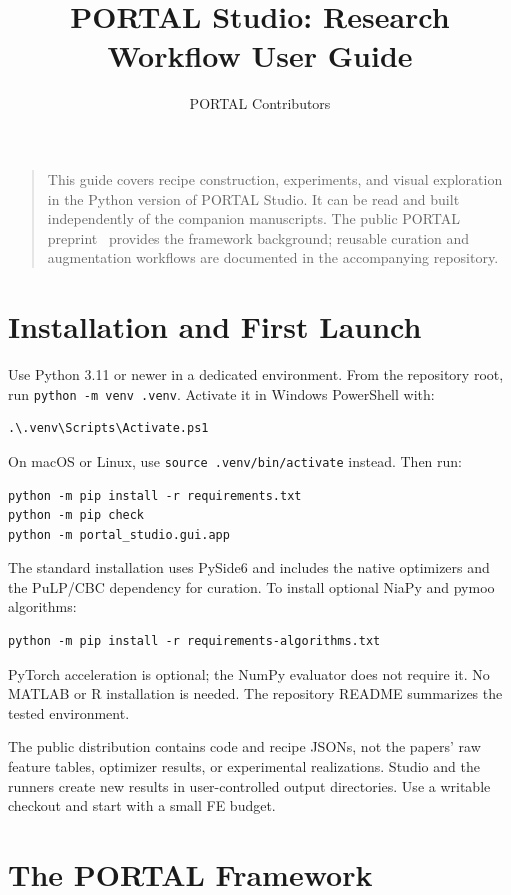 \documentclass[journal,onecolumn]{IEEEtran}
\title{PORTAL Studio: Research Workflow User Guide}
\author{PORTAL Contributors}
\begin{document}
\maketitle
\begin{quote}
\small
This guide covers recipe construction, experiments, and visual exploration in the Python version of PORTAL Studio. It can be read and built independently of the companion manuscripts. The public PORTAL preprint~\cite{portal2025framework} provides the framework background; reusable curation and augmentation workflows are documented in the accompanying repository.
\end{quote}
\tableofcontents
\clearpage

\section{Installation and First Launch}
\label{sec:manual:installation}

Use Python 3.11 or newer in a dedicated environment. From the repository root,
run \texttt{python -m venv .venv}. Activate it in Windows PowerShell with:
\begin{verbatim}
.\.venv\Scripts\Activate.ps1
\end{verbatim}
On macOS or Linux, use \texttt{source .venv/bin/activate} instead. Then run:
\begin{verbatim}
python -m pip install -r requirements.txt
python -m pip check
python -m portal_studio.gui.app
\end{verbatim}
The standard installation uses PySide6 and includes the native optimizers and
the PuLP/CBC dependency for curation. To install optional NiaPy and pymoo algorithms:
\begin{verbatim}
python -m pip install -r requirements-algorithms.txt
\end{verbatim}
PyTorch acceleration is optional; the NumPy evaluator does not require it.
No MATLAB or R installation is needed. The repository README summarizes the
tested environment.

The public distribution contains code and recipe JSONs, not the papers' raw
feature tables, optimizer results, or experimental realizations. Studio and
the runners create new results in user-controlled output directories. Use a
writable checkout and start with a small FE budget.

\section{The PORTAL Framework}
\label{sec:manual:conceptual}
\end{document}
